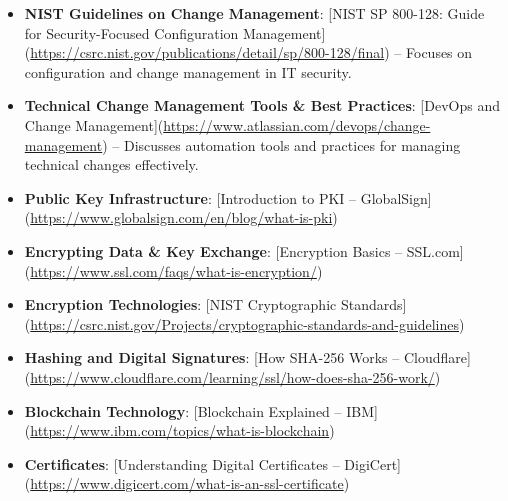 \documentclass[11pt]{article}
\begin{document}
\begin{itemize}
\item \textbf{NIST Guidelines on Change Management}:
{[}NIST SP 800-128: Guide for Security-Focused Configuration Management](\url{https://csrc.nist.gov/publications/detail/sp/800-128/final}) – Focuses on configuration and change management in IT security.
\item \textbf{Technical Change Management Tools \& Best Practices}:
{[}DevOps and Change Management](\url{https://www.atlassian.com/devops/change-management}) – Discusses automation tools and practices for managing technical changes effectively.
\item \textbf{\textbf{Public Key Infrastructure}}:
{[}Introduction to PKI – GlobalSign](\url{https://www.globalsign.com/en/blog/what-is-pki})
\item \textbf{\textbf{Encrypting Data \& Key Exchange}}:
{[}Encryption Basics – SSL.com](\url{https://www.ssl.com/faqs/what-is-encryption/})
\item \textbf{\textbf{Encryption Technologies}}:
{[}NIST Cryptographic Standards](\url{https://csrc.nist.gov/Projects/cryptographic-standards-and-guidelines})
\item \textbf{\textbf{Hashing and Digital Signatures}}:
{[}How SHA-256 Works – Cloudflare](\url{https://www.cloudflare.com/learning/ssl/how-does-sha-256-work/})
\item \textbf{\textbf{Blockchain Technology}}:
{[}Blockchain Explained – IBM](\url{https://www.ibm.com/topics/what-is-blockchain})
\item \textbf{\textbf{Certificates}}:
{[}Understanding Digital Certificates – DigiCert](\url{https://www.digicert.com/what-is-an-ssl-certificate})
\end{itemize}
\end{document}
